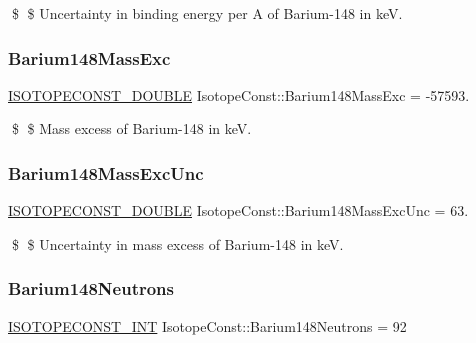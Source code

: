 \$ \$ Uncertainty in binding energy per A of Barium-\/148 in keV. \mbox{\label{group___isotope_const-_barium-_ba148_ga086eb77bc83099c8ed90e0949d252a52}} 
\subsubsection{\texorpdfstring{Barium148\+Mass\+Exc}{Barium148MassExc}}
{\footnotesize\ttfamily \mbox{\hyperlink{group___isotope_const-_macros_ga8f45a7272ce02c0b4c65c44636ed719a}{I\+S\+O\+T\+O\+P\+E\+C\+O\+N\+S\+T\+\_\+\+D\+O\+U\+B\+LE}} Isotope\+Const\+::\+Barium148\+Mass\+Exc = -\/57593.}

\$ \$ Mass excess of Barium-\/148 in keV. \mbox{\label{group___isotope_const-_barium-_ba148_ga0565a6348b884aff998d92b65e8489bf}} 
\subsubsection{\texorpdfstring{Barium148\+Mass\+Exc\+Unc}{Barium148MassExcUnc}}
{\footnotesize\ttfamily \mbox{\hyperlink{group___isotope_const-_macros_ga8f45a7272ce02c0b4c65c44636ed719a}{I\+S\+O\+T\+O\+P\+E\+C\+O\+N\+S\+T\+\_\+\+D\+O\+U\+B\+LE}} Isotope\+Const\+::\+Barium148\+Mass\+Exc\+Unc = 63.}

\$ \$ Uncertainty in mass excess of Barium-\/148 in keV. \mbox{\label{group___isotope_const-_barium-_ba148_ga3a0360aed5f29bc0ee9617f67638de3f}} 
\subsubsection{\texorpdfstring{Barium148\+Neutrons}{Barium148Neutrons}}
{\footnotesize\ttfamily \mbox{\hyperlink{group___isotope_const-_macros_ga5f18360b3e99483a35c32d789e62621c}{I\+S\+O\+T\+O\+P\+E\+C\+O\+N\+S\+T\+\_\+\+I\+NT}} Isotope\+Const\+::\+Barium148\+Neutrons = 92}


